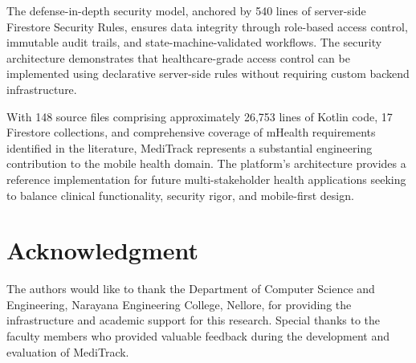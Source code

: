 \documentclass[journal,onecolumn,web]{ieeecolor}
\begin{document}
The defense-in-depth security model, anchored by 540
lines of server-side Firestore Security Rules, ensures
data integrity through role-based access control,
immutable audit trails, and state-machine-validated
workflows. The security architecture demonstrates
that healthcare-grade access control can be
implemented using declarative server-side rules
without requiring custom backend infrastructure.

With 148 source files comprising approximately 26,753
lines of Kotlin code, 17 Firestore collections, and
comprehensive coverage of mHealth requirements
identified in the literature, MediTrack represents a
substantial engineering contribution to the mobile
health domain. The platform's architecture provides a
reference implementation for future multi-stakeholder
health applications seeking to balance clinical
functionality, security rigor, and mobile-first
design.

\section*{Acknowledgment}
The authors would like to thank the Department of
Computer Science and Engineering, Narayana Engineering
College, Nellore, for providing the infrastructure
and academic support for this research. Special thanks
to the faculty members who provided valuable feedback
during the development and evaluation of MediTrack.

\end{document}
